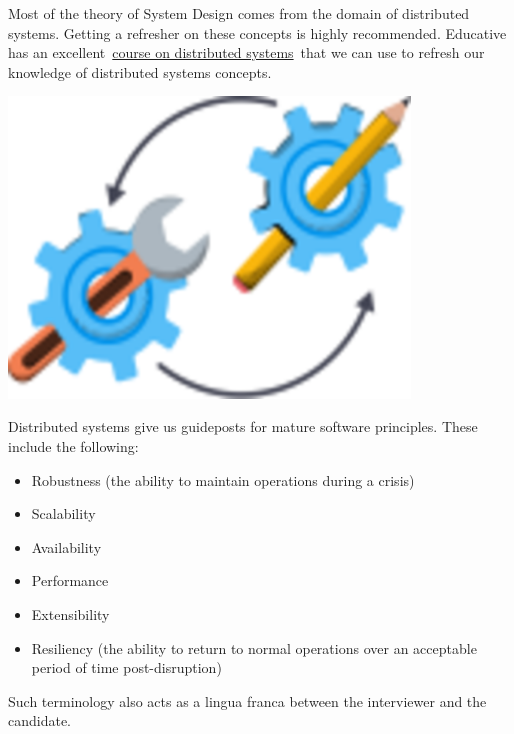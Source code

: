\noindent
\begin{minipage}[t]{0.48\textwidth}
Most of the theory of System Design comes from the domain of distributed systems. Getting a refresher on these concepts is highly recommended. Educative has an excellent~\href{https://www.educative.io/courses/distributed-systems-practitioners}{course on distributed systems}~that we can use to refresh our knowledge of distributed systems concepts.
\end{minipage}
\hfill
\begin{minipage}[t]{0.48\textwidth}
\includegraphics[width=0.8\textwidth]{Images/chapter_1/section_4771234193080320/5874390653075456.png}
\end{minipage}

Distributed systems give us guideposts for mature software principles. These include the following:

\begin{itemize}
\item
{}\label{8kWi4A5f2dvVaS_hyGAi2}
Robustness (the ability to maintain operations during a crisis)
\item
{}\label{n3X5NCP6M5Okm3RpeZFRy}
Scalability
\item
{}\label{wgHfXTx2euzdgaOwBdrv_}
Availability
\item
{}\label{Ao7XJxlae4646PY6EfSGQ}
Performance
\item
{}\label{UY-ZFRoBhpqHsi-D-u2X5}
Extensibility
\item
{}\label{2T30P2o-IzhDNLgBA_m8P}
Resiliency (the ability to return to normal operations over an acceptable period of time post-disruption)
\end{itemize}

Such terminology also acts as a lingua franca between the interviewer and the candidate.

